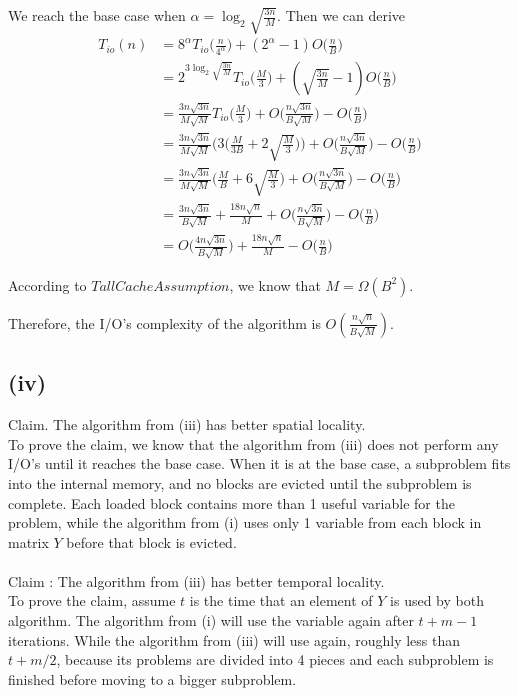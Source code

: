 We reach the base case when $\alpha = \log_2{ \sqrt{ \frac{3n}{M} }}$. Then we can derive
\begin{align*}
    T_{io}(n) &= 8^{\alpha}T_{io}\Big(\frac{n}{4^\alpha}\Big) + ( 2^{\alpha} - 1 )O\Big(\frac{n}{B}\Big) \\
              &= 2^{3\log_2{ \sqrt{ \frac{3n}{M} }}} T_{io}\Big( \frac{M}{3} \Big) + ( \sqrt{ \frac{3n}{M} } - 1 )O\Big(\frac{n}{B}\Big) \\
              &= \frac{3n\sqrt{3n}}{M\sqrt{M}} T_{io}\Big( \frac{M}{3} \Big) + O\Big(\frac{n\sqrt{3n}}{B\sqrt{M}}\Big) - O\Big(\frac{n}{B}\Big)\\
&= \frac{3n\sqrt{3n}}{M\sqrt{M}} \Big( 3 \Big(\frac{M}{3B} + 2\sqrt{\frac{M}{3}}\Big)\Big) + O\Big(\frac{n\sqrt{3n}}{B\sqrt{M}}\Big)- O\Big(\frac{n}{B}\Big) \\
&= \frac{3n\sqrt{3n}}{M\sqrt{M}} \Big( \frac{M}{B} + 6\sqrt{\frac{M}{3}}\Big) + O\Big(\frac{n\sqrt{3n}}{B\sqrt{M}}\Big)- O\Big(\frac{n}{B}\Big) \\
&= \frac{3n\sqrt{3n}}{B\sqrt{M}} + \frac{18n\sqrt{n}}{M} + O\Big(\frac{n\sqrt{3n}}{B\sqrt{M}}\Big)- O\Big(\frac{n}{B}\Big) \\
&= O\Big(\frac{4n\sqrt{3n}}{B\sqrt{M}}\Big) + \frac{18n\sqrt{n}}{M} - O\Big(\frac{n}{B}\Big)
\end{align*}

According to $Tall Cache Assumption$, we know that $M = \Omega(B^2)$.

Therefore, the I/O's complexity of the algorithm is $O(\frac{n\sqrt{n}}{B\sqrt{M}})$.


\subsection*{(iv)}

Claim. The algorithm from (iii) has better spatial locality.
\\

To prove the claim, we know that the algorithm from (iii) does not perform any I/O's until
it reaches the base case. When it is at the base case, a subproblem fits into the internal memory,
and no blocks are evicted until the subproblem is complete. Each loaded block contains more than 1 useful
variable for the problem, while the algorithm from (i) uses only 1 variable from each block in matrix $Y$ before
that block is evicted.
\\\\
Claim : The algorithm from (iii) has better temporal locality.
\\

To prove the claim, assume $t$ is the time that an element of $Y$ is used by both algorithm. The algorithm
from (i) will use the variable again after $t + m-1$ iterations. While the algorithm from (iii) will use again,
roughly less than $ t + m/2$, because its problems are divided into 4 pieces and each subproblem is finished
before moving to a bigger subproblem.
